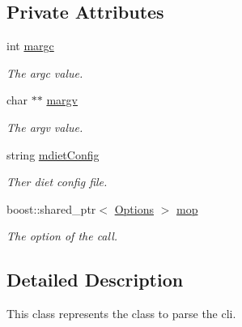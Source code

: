 \subsection*{Private Attributes}
\begin{DoxyCompactItemize}
\item 
\hypertarget{classCLICmd_a55deb56daf3926739e9c43e9275cebee}{
int \hyperlink{classCLICmd_a55deb56daf3926739e9c43e9275cebee}{margc}}
\label{classCLICmd_a55deb56daf3926739e9c43e9275cebee}

\begin{DoxyCompactList}\small\item\em The argc value. \item\end{DoxyCompactList}\item 
\hypertarget{classCLICmd_ae0007becec7bb0edf881e893ae52d146}{
char $\ast$$\ast$ \hyperlink{classCLICmd_ae0007becec7bb0edf881e893ae52d146}{margv}}
\label{classCLICmd_ae0007becec7bb0edf881e893ae52d146}

\begin{DoxyCompactList}\small\item\em The argv value. \item\end{DoxyCompactList}\item 
\hypertarget{classCLICmd_af29a86d75b1fc016834dc0a1e153c074}{
string \hyperlink{classCLICmd_af29a86d75b1fc016834dc0a1e153c074}{mdietConfig}}
\label{classCLICmd_af29a86d75b1fc016834dc0a1e153c074}

\begin{DoxyCompactList}\small\item\em Ther diet config file. \item\end{DoxyCompactList}\item 
\hypertarget{classCLICmd_a52b8b2e326acae016090856aab3e3e55}{
boost::shared\_\-ptr$<$ \hyperlink{classOptions}{Options} $>$ \hyperlink{classCLICmd_a52b8b2e326acae016090856aab3e3e55}{mop}}
\label{classCLICmd_a52b8b2e326acae016090856aab3e3e55}

\begin{DoxyCompactList}\small\item\em The option of the call. \item\end{DoxyCompactList}\end{DoxyCompactItemize}


\subsection{Detailed Description}
This class represents the class to parse the cli. 

